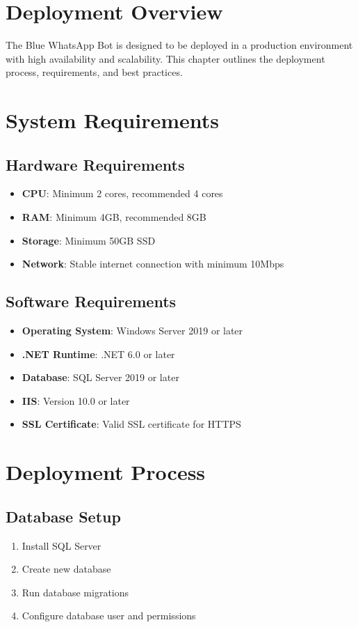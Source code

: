 \section{Deployment Overview}
The Blue WhatsApp Bot is designed to be deployed in a production environment with high availability and scalability. This chapter outlines the deployment process, requirements, and best practices.

\section{System Requirements}

\subsection{Hardware Requirements}
\begin{itemize}
    \item \textbf{CPU}: Minimum 2 cores, recommended 4 cores
    \item \textbf{RAM}: Minimum 4GB, recommended 8GB
    \item \textbf{Storage}: Minimum 50GB SSD
    \item \textbf{Network}: Stable internet connection with minimum 10Mbps
\end{itemize}

\subsection{Software Requirements}
\begin{itemize}
    \item \textbf{Operating System}: Windows Server 2019 or later
    \item \textbf{.NET Runtime}: .NET 6.0 or later
    \item \textbf{Database}: SQL Server 2019 or later
    \item \textbf{IIS}: Version 10.0 or later
    \item \textbf{SSL Certificate}: Valid SSL certificate for HTTPS
\end{itemize}

\section{Deployment Process}

\subsection{Database Setup}
\begin{enumerate}
    \item Install SQL Server
    \item Create new database
    \item Run database migrations
    \item Configure database user and permissions
\end{enumerate}

